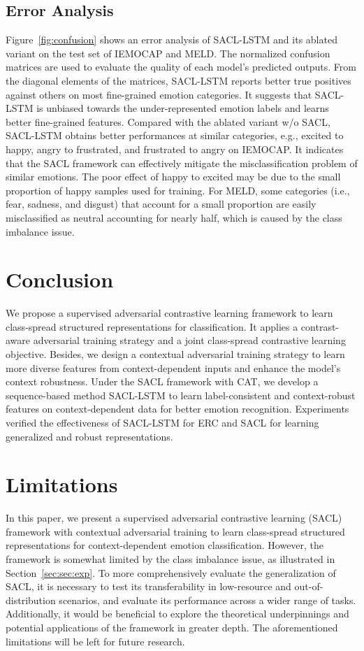 \documentclass[11pt]{article}
\begin{document}
\subsection{Error Analysis}
Figure~\ref{fig:confusion} shows an error analysis of SACL-LSTM and its ablated variant on the test set of IEMOCAP and MELD.
The normalized confusion matrices are used to evaluate the quality of each model's predicted outputs.
From the diagonal elements of the matrices, SACL-LSTM reports better true positives against others on most fine-grained emotion categories.
It suggests that SACL-LSTM is unbiased towards the under-represented emotion labels and learns better fine-grained features.
Compared with the ablated variant {{w/o SACL}}, SACL-LSTM obtains better performances at similar categories, e.g., excited to happy, angry to frustrated, and frustrated to angry on IEMOCAP. It indicates that the SACL framework can effectively mitigate the misclassification problem of similar emotions. 
The poor effect of happy to excited may be due to the small proportion of happy samples used for training.
For MELD, some categories (i.e., fear, sadness, and disgust) that account for a small proportion are easily misclassified as neutral accounting for nearly half, which is caused by the class imbalance issue.


\section{Conclusion}
We propose a supervised adversarial contrastive learning framework to learn class-spread structured representations for classification. 
It applies a contrast-aware adversarial training strategy and a joint class-spread contrastive learning objective.
Besides, we design a contextual adversarial training strategy to learn more diverse features from context-dependent inputs and enhance the model's context robustness.
Under the SACL framework with CAT, we develop a sequence-based method SACL-LSTM to learn label-consistent and context-robust features on context-dependent data for better emotion recognition. 
Experiments verified the effectiveness of SACL-LSTM for ERC and SACL for learning generalized and robust representations.

\section*{Limitations}
In this paper, we present a supervised adversarial contrastive learning (SACL) framework with contextual adversarial training to learn class-spread structured representations for context-dependent emotion classification.
However, the framework is somewhat limited by the class imbalance issue, as illustrated in Section~\ref{sec:sec:exp}.
To more comprehensively evaluate the generalization of SACL, it is necessary to test its transferability in low-resource and out-of-distribution scenarios, and evaluate its performance across a wider range of tasks.
Additionally, it would be beneficial to explore the theoretical underpinnings and potential applications of the framework in greater depth.
The aforementioned limitations will be left for future research.
\end{document}
